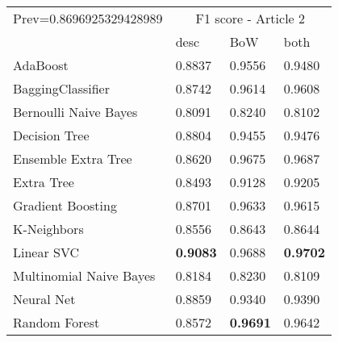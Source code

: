 \begin{tabular}{|l|l|l|l| }
\hline
Prev=0.8696925329428989 &  \multicolumn{3}{c|}{F1 score - Article 2} \\
\cline{2-4} & desc & BoW & both \\ \hline
AdaBoost                & 0.8837 & 0.9556 & 0.9480\\
BaggingClassifier       & 0.8742 & 0.9614 & 0.9608\\
Bernoulli Naive Bayes   & 0.8091 & 0.8240 & 0.8102\\
Decision Tree           & 0.8804 & 0.9455 & 0.9476\\
Ensemble Extra Tree     & 0.8620 & 0.9675 & 0.9687\\
Extra Tree              & 0.8493 & 0.9128 & 0.9205\\
Gradient Boosting       & 0.8701 & 0.9633 & 0.9615\\
K-Neighbors             & 0.8556 & 0.8643 & 0.8644\\
Linear SVC              & {\bf 0.9083} & 0.9688 & {\bf 0.9702}\\
Multinomial Naive Bayes & 0.8184 & 0.8230 & 0.8109\\
Neural Net              & 0.8859 & 0.9340 & 0.9390\\
Random Forest           & 0.8572 & {\bf 0.9691} & 0.9642\\
\hline
\end{tabular}